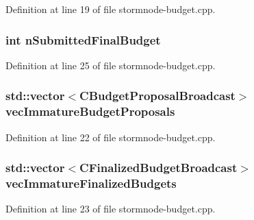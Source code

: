 Definition at line 19 of file stormnode-\/budget.\+cpp.

\hypertarget{stormnode-budget_8cpp_ae7a238980012394beb6c3a09d00984b8}{}
\subsubsection[{n\+Submitted\+Final\+Budget}]{\setlength{\rightskip}{0pt plus 5cm}int n\+Submitted\+Final\+Budget}\label{stormnode-budget_8cpp_ae7a238980012394beb6c3a09d00984b8}


Definition at line 25 of file stormnode-\/budget.\+cpp.

\hypertarget{stormnode-budget_8cpp_ad799c6b69cfbea7cdd37386b6b2a1429}{}
\subsubsection[{vec\+Immature\+Budget\+Proposals}]{\setlength{\rightskip}{0pt plus 5cm}std\+::vector$<${\bf C\+Budget\+Proposal\+Broadcast}$>$ vec\+Immature\+Budget\+Proposals}\label{stormnode-budget_8cpp_ad799c6b69cfbea7cdd37386b6b2a1429}


Definition at line 22 of file stormnode-\/budget.\+cpp.

\hypertarget{stormnode-budget_8cpp_adc3baf3c59479fff7d14e28c1496a178}{}
\subsubsection[{vec\+Immature\+Finalized\+Budgets}]{\setlength{\rightskip}{0pt plus 5cm}std\+::vector$<${\bf C\+Finalized\+Budget\+Broadcast}$>$ vec\+Immature\+Finalized\+Budgets}\label{stormnode-budget_8cpp_adc3baf3c59479fff7d14e28c1496a178}


Definition at line 23 of file stormnode-\/budget.\+cpp.

